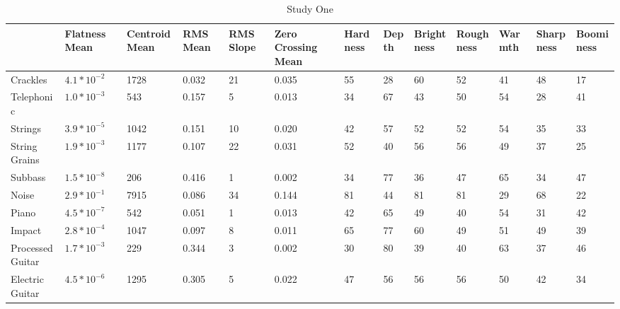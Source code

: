 \documentclass[]{interact}
\theoremstyle{plain}%
\theoremstyle{definition}
\theoremstyle{remark}
\begin{document}
\begin{table}[h]
\begin{subtable}[h]{\linewidth}
{\begin{tabularx}{1.5\textwidth}
{} &  Flatness Mean &  Centroid Mean &  RMS Mean &  RMS Slope &  Zero Crossing Mean &  Hardness &  Depth &  Brightness &  Roughness &  Warmth &  Sharpness &  Boominess \\
\midrule
Crackles         &  $4.1 * 10^{-2}$ &           1728 &     0.032 &          21 &               0.035 &        55 &     28 &          60 &         52 &      41 &         48 &         17 \\
Telephonic       &  $1.0 * 10^{-3}$ &            543 &     0.157 &           5 &               0.013 &        34 &     67 &          43 &         50 &      54 &         28 &         41 \\
Strings          &  $3.9 * 10^{-5}$ &           1042 &     0.151 &          10 &               0.020 &        42 &     57 &          52 &         52 &      54 &         35 &         33 \\
String Grains    &  $1.9 * 10^{-3}$ &           1177 &     0.107 &          22 &               0.031 &        52 &     40 &          56 &         56 &      49 &         37 &         25 \\
Subbass          &  $1.5 * 10^{-8}$ &            206 &     0.416 &           1 &               0.002 &        34 &     77 &          36 &         47 &      65 &         34 &         47 \\
Noise            &  $2.9 * 10^{-1}$ &           7915 &     0.086 &          34 &               0.144 &        81 &     44 &          81 &         81 &      29 &         68 &         22 \\
Piano            &  $4.5 * 10^{-7}$ &            542 &     0.051 &           1 &               0.013 &        42 &     65 &          49 &         40 &      54 &         31 &         42 \\
Impact           &  $2.8 * 10^{-4}$ &           1047 &     0.097 &           8 &               0.011 &        65 &     77 &          60 &         49 &      51 &         49 &         39 \\
Processed Guitar &  $1.7 * 10^{-3}$ &            229 &     0.344 &           3 &               0.002 &        30 &     80 &          39 &         40 &      63 &         37 &         46 \\
Electric Guitar  &  $4.5 * 10^{-6}$ &           1295 &     0.305 &           5 &               0.022 &        47 &     56 &          56 &         56 &      50 &         42 &         34 \\
\bottomrule
\end{tabularx}
}
\label{subtab:study1_audiofeatures}
\caption{Study One}
\end{subtable}


\end{table}
\end{document}
